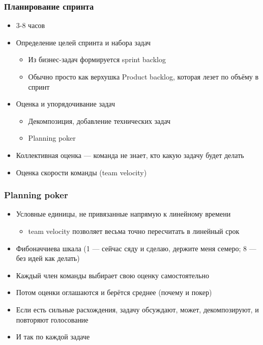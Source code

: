\documentclass{../../slides-style}
\begin{document}
    \begin{frame}
        \frametitle{Планирование спринта}
        \begin{itemize}
            \item 3-8 часов
            \item Определение целей спринта и набора задач
            \begin{itemize}
                \item Из бизнес-задач формируется sprint backlog
                \item Обычно просто как верхушка Product backlog, которая лезет по
                объёму в спринт
            \end{itemize}
            \item Оценка и упорядочивание задач
            \begin{itemize}
                \item Декомпозиция, добавление технических задач
                \item Planning poker
            \end{itemize}
            \item Коллективная оценка --- команда не знает, кто какую задачу
            будет делать
            \item Оценка скорости команды (team velocity)
        \end{itemize}
    \end{frame}

    \begin{frame}
        \frametitle{Planning poker}
        \begin{itemize}
            \item Условные единицы, не привязанные напрямую к линейному времени
            \begin{itemize}
                \item team velocity позволяет весьма точно пересчитать в линейный срок
            \end{itemize}
            \item Фибоначчиева шкала (1 --- сейчас сяду и сделаю, держите меня семеро; 8 --- без идей как делать)
            \item Каждый член команды выбирает свою оценку самостоятельно
            \item Потом оценки оглашаются и берётся среднее (почему и покер)
            \item Если есть сильные расхождения, задачу обсуждают, может, декомпозируют, и повторяют голосование
            \item И так по каждой задаче
        \end{itemize}
    \end{frame}
\end{document}

